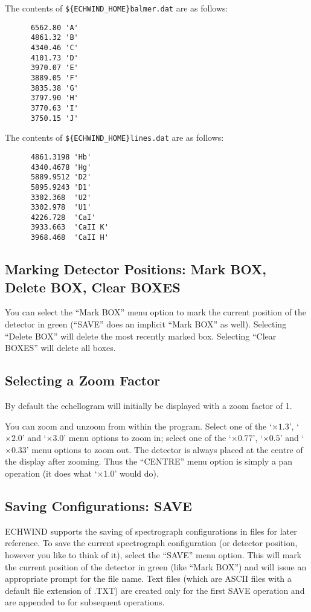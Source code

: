 \documentclass[11pt]{article}
\begin{document}
The contents of \verb+${ECHWIND_HOME}balmer.dat+ are as follows:

\begin{verbatim}
      6562.80 'A'
      4861.32 'B'
      4340.46 'C'
      4101.73 'D'
      3970.07 'E'
      3889.05 'F'
      3835.38 'G'
      3797.90 'H'
      3770.63 'I'
      3750.15 'J'
\end{verbatim}

The contents of \verb+${ECHWIND_HOME}lines.dat+ are as follows:

\begin{verbatim}
      4861.3198 'Hb'
      4340.4678 'Hg'
      5889.9512 'D2'
      5895.9243 'D1'
      3302.368  'U2'
      3302.978  'U1'
      4226.728  'CaI'
      3933.663  'CaII K'
      3968.468  'CaII H'
\end{verbatim}

\subsection{Marking Detector Positions: Mark BOX, Delete BOX, Clear BOXES}

You can select the ``Mark BOX'' menu option to mark the current position of the
detector in green (``SAVE'' does an implicit ``Mark BOX'' as well). Selecting
``Delete BOX'' will delete the most recently marked box. Selecting ``Clear
BOXES'' will delete all boxes.

\subsection{Selecting a Zoom Factor}

By default the echellogram will initially be displayed with a zoom factor of 1.

You can zoom and unzoom from within the program. Select one of the `$
\times  1.3$', `$ \times 2.0$' and `$ \times 3.0$' menu options to zoom in;
select one of the `$ \times 0.77$', `$ \times 0.5$' and `$ \times 0.33$'
menu options to zoom out. The detector is always placed at the centre of
the display after zooming. Thus the ``CENTRE'' menu option is simply a pan
operation (it does what `$ \times 1.0$' would do).

\subsection{Saving Configurations: SAVE}

ECHWIND supports the saving of spectrograph configurations in files for
later reference. To save the current spectrograph configuration (or
detector position, however you like to think of it), select the ``SAVE''
menu option. This will mark the current position of the detector in green
(like ``Mark BOX'') and will issue an appropriate prompt for the file name. 
Text files (which are ASCII files with a default file extension of
.TXT) are created only for the first SAVE operation and are appended to for
subsequent operations.
\end{document}
